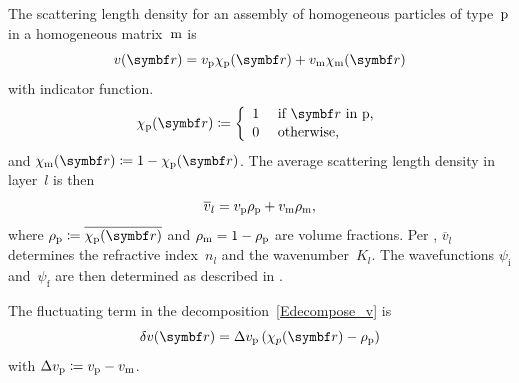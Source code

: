 The scattering length density for an assembly of homogeneous particles of type~$\sp$
in a homogeneous matrix~$\sm$ is
\begin{equation}
  v(\r) = v_\sp \chi_\sp(\r) + v_\sm \chi_\sm(\r)
\end{equation}
with indicator function.
\begin{equation}\label{EdefChiP}
  \chi_\sp(\r)\coloneqq\left\{\begin{array}{ll}
  1&\text{~if $\r$ in p,}\\[.2ex]
  0&\text{~otherwise,} \end{array}\right.
\end{equation}
%
%
and $\chi_\sm(\r)\coloneqq 1-\chi_\sp(\r)$.
The average scattering length density in layer~$l$ is then
\begin{equation}
  \overline{v}_l = v_\sp\rho_\sp + v_\sm\rho_\sm,
\end{equation}
where $\rho_\sp\coloneqq\overline{\chi_\sp(\r)}$ and $\rho_\sm=1-\rho_\sp$
are volume fractions.
Per , $\overline{v}_l$ determines the refractive index~$n_l$
and the wavenumber~$K_l$.
The wavefunctions $\psi_\text{i}$ and~$\psi_\text{f}$
are then determined as described in .

The fluctuating term in the decomposition~\cref{Edecompose_v} is
\begin{equation}
  \delta v(\r) = \Delta v_\sp\left(\chi_p(\r)-\rho_\sp\right)
\end{equation}
with $\Delta v_\sp\coloneqq v_\sp-v_\sm$.


